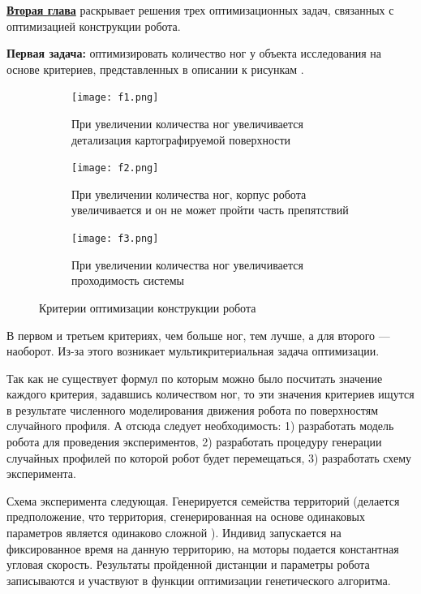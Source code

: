 
\textbf{\underline{Вторая глава}} раскрывает решения трех оптимизационных задач, связанных с оптимизацией конструкции робота.

\textbf{Первая задача:} оптимизировать количество ног у объекта исследования на основе критериев, представленных в описании к рисункам . 

\begin{figure}[H]
    \begin{subfigure}{0.49\textwidth}
        \centering\texttt{[image: f1.png]}
        \caption{При увеличении количества ног увеличивается детализация картографируемой поверхности}
        \label{fig:f1.png}
    \end{subfigure}
    \begin{subfigure}{0.49\textwidth}
        \centering\texttt{[image: f2.png]}
        \caption{При увеличении количества ног, корпус робота увеличивается и он не может пройти часть препятствий}
        \label{fig:f2.png}
    \end{subfigure}

    \hfill
    \begin{subfigure}{\textwidth}
        \centering\texttt{[image: f3.png]}
        \caption{При увеличении количества ног увеличивается проходимость системы}
        \label{fig:f3.png}
    \end{subfigure}
    \hfill

\caption{Критерии оптимизации конструкции робота}
\label{fig:opti_criteria}
\end{figure}

В первом  и третьем  критериях, чем больше ног, тем лучше, а для второго  --- наоборот. Из-за этого возникает мультикритериальная задача оптимизации. 

Так как не существует формул по которым можно было  посчитать значение каждого критерия, задавшись количеством ног, то эти значения критериев ищутся в результате численного моделирования движения робота по поверхностям случайного профиля. А отсюда следует необходимость: 1) разработать модель робота для проведения экспериментов, 2) разработать процедуру генерации случайных профилей по которой робот будет перемещаться, 3) разработать схему эксперимента.

Схема эксперимента следующая. Генерируется семейства территорий (делается предположение, что территория, сгенерированная на основе одинаковых параметров является одинаково сложной ). Индивид запускается на фиксированное время на данную территорию, на моторы подается константная угловая скорость. Результаты пройденной дистанции и параметры робота записываются и участвуют в функции оптимизации генетического алгоритма.

